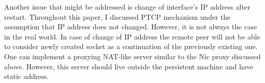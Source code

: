Another issue that might be addressed is change of interface's IP address after
restart. Throughout this paper, I discussed PTCP mechanism under the assumption
that IP address does not changed. However, it is not always the case in the
real world. In case of change of IP address the remote peer will not be able
to consider newly created socket as a continuation of the previously existing
one. One can implement a proxying NAT-like server similar to the Nic proxy
discussed above. However, this server should live outside the persistent
machine and have static address.


